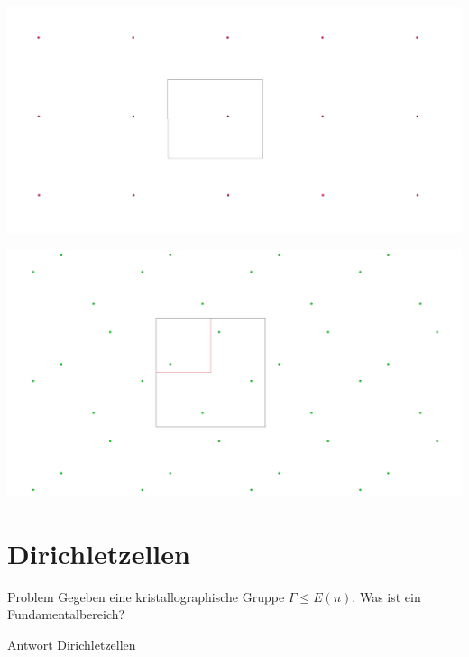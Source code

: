 \documentclass{beamer}
\theoremstyle{plain}
\begin{document}
\begin{frame}
    \centering
    \includegraphics[width=\textwidth]{images/p1-escher.png}
\end{frame}

\begin{frame}
    \centering
    \includegraphics[width=\textwidth]{images/p4-escher.png}
\end{frame}


\section{Dirichletzellen}
\begin{frame}
    \begin{alertblock}{Problem}
        Gegeben eine kristallographische Gruppe $\Gamma \leq E(n)$. Was ist ein Fundamentalbereich?
    \end{alertblock}
    \pause
    \begin{exampleblock}{Antwort}
        Dirichletzellen
    \end{exampleblock}
\end{frame}
\end{document}
